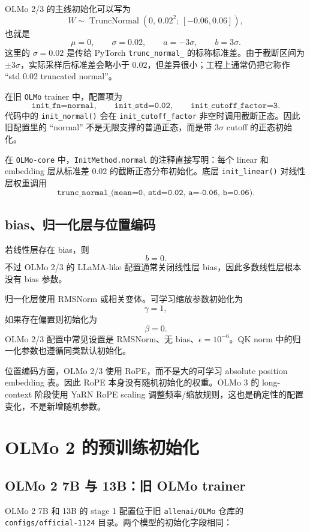 \documentclass[UTF8,a4paper,11pt]{ctexart}
\newcommand{\TruncNormal}{\operatorname{TruncNormal}}
\begin{document}
OLMo 2/3 的主线初始化可以写为
\[
  W \sim \TruncNormal\left(0,\,0.02^2;\,[-0.06,0.06]\right),
\]
也就是
\[
  \mu=0,\qquad \sigma=0.02,\qquad a=-3\sigma,\qquad b=3\sigma .
\]
这里的 $\sigma=0.02$ 是传给 PyTorch \texttt{trunc\_normal\_} 的标称标准差。由于截断区间为 $\pm3\sigma$，实际采样后标准差会略小于 $0.02$，但差异很小；工程上通常仍把它称作 ``std 0.02 truncated normal''。

在旧 \texttt{OLMo} trainer 中，配置项为
\[
  \texttt{init\_fn=normal},\qquad
  \texttt{init\_std=0.02},\qquad
  \texttt{init\_cutoff\_factor=3}.
\]
代码中的 \texttt{init\_normal()} 会在 \texttt{init\_cutoff\_factor} 非空时调用截断正态。因此旧配置里的 ``normal'' 不是无限支撑的普通正态，而是带 $3\sigma$ cutoff 的正态初始化。

在 \texttt{OLMo-core} 中，\texttt{InitMethod.normal} 的注释直接写明：每个 linear 和 embedding 层从标准差 $0.02$ 的截断正态分布初始化。底层 \texttt{init\_linear()} 对线性层权重调用
\[
  \texttt{trunc\_normal\_(mean=0,\ std=0.02,\ a=-0.06,\ b=0.06)} .
\]

\subsection{bias、归一化层与位置编码}

若线性层存在 bias，则
\[
  b=0.
\]
不过 OLMo 2/3 的 LLaMA-like 配置通常关闭线性层 bias，因此多数线性层根本没有 bias 参数。

归一化层使用 RMSNorm 或相关变体。可学习缩放参数初始化为
\[
  \gamma=1,
\]
如果存在偏置则初始化为
\[
  \beta=0.
\]
OLMo 2/3 配置中常见设置是 RMSNorm、无 bias、$\epsilon=10^{-6}$。QK norm 中的归一化参数也遵循同类默认初始化。

位置编码方面，OLMo 2/3 使用 RoPE，而不是大的可学习 absolute position embedding 表。因此 RoPE 本身没有随机初始化的权重。OLMo 3 的 long-context 阶段使用 YaRN RoPE scaling 调整频率/缩放规则，这也是确定性的配置变化，不是新增随机参数。

\section{OLMo 2 的预训练初始化}

\subsection{OLMo 2 7B 与 13B：旧 OLMo trainer}

OLMo 2 7B 和 13B 的 stage 1 配置位于旧 \texttt{allenai/OLMo} 仓库的 \texttt{configs/official-1124} 目录。两个模型的初始化字段相同：
\end{document}
